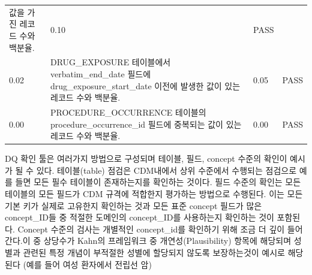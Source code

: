 \documentclass[11pt]{book}
\theoremstyle{definition}
\theoremstyle{definition}
\theoremstyle{definition}
\theoremstyle{remark}
\begin{document}
\begin{longtable}[]{@{}llll@{}}
\begin{minipage}[t]{0.47\columnwidth}
값을 가진 레코드 수와 백분율.\strut
\end{minipage} & \begin{minipage}[t]{0.10\columnwidth}\raggedright\strut
0.10\strut
\end{minipage} & \begin{minipage}[t]{0.07\columnwidth}\raggedright\strut
PASS\strut
\end{minipage}\tabularnewline
\begin{minipage}[t]{0.12\columnwidth}\raggedright\strut
0.02\strut
\end{minipage} & \begin{minipage}[t]{0.47\columnwidth}\raggedright\strut
DRUG\_EXPOSURE 테이블에서 verbatim\_end\_date 필드에
drug\_exposure\_start\_date 이전에 발생한 값이 있는 레코드 수와
백분율.\strut
\end{minipage} & \begin{minipage}[t]{0.10\columnwidth}\raggedright\strut
0.05\strut
\end{minipage} & \begin{minipage}[t]{0.07\columnwidth}\raggedright\strut
PASS\strut
\end{minipage}\tabularnewline
\begin{minipage}[t]{0.12\columnwidth}\raggedright\strut
0.00\strut
\end{minipage} & \begin{minipage}[t]{0.47\columnwidth}\raggedright\strut
PROCEDURE\_OCCURRENCE 테이블의 procedure\_occurrence\_id 필드에 중복되는
값이 있는 레코드 수와 백분율.\strut
\end{minipage} & \begin{minipage}[t]{0.10\columnwidth}\raggedright\strut
0.00\strut
\end{minipage} & \begin{minipage}[t]{0.07\columnwidth}\raggedright\strut
PASS\strut
\end{minipage}\tabularnewline
\bottomrule
\end{longtable}

DQ 확인 툴은 여러가지 방법으로 구성되며 테이블, 필드, concept 수준의
확인이 예시가 될 수 있다. 테이블(table) 점검은 CDM내에서 상위 수준에서
수행되는 점검으로 예를 들면 모든 필수 테이블이 존재하는지를 확인하는
것이다. 필드 수준의 확인는 모든 테이블의 모든 필드가 CDM 규격에 적합한지
평가하는 방법으로 수행된다. 이는 모든 기본 키가 실제로 고유한지 확인하는
것과 모든 표준 concept 필드가 많은 concept\_ID들 중 적절한 도메인의
concept\_ID를 사용하는지 확인하는 것이 포함된다. Concept 수준의 검사는
개별적인 concept\_id를 확인하기 위해 조금 더 깊이 들어간다.이 중
상당수가 Kahn의 프레임워크 중 개연성(Plausibility) 항목에 해당되며
성별과 관련된 특정 개념이 부적절한 성별에 할당되지 않도록 보장하는것이
예시로 해당된다 (예를 들어 여성 환자에서 전립선 암)
\end{document}
